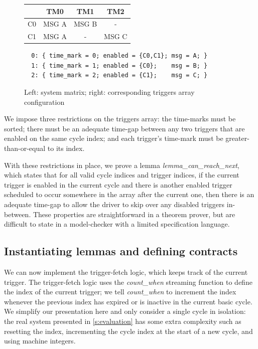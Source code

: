 \documentclass[a4paper,UKenglish,cleveref, autoref, thm-restate,anonymous]{lipics-v2021}
\begin{document}
\begin{figure}
  \begin{minipage}{0.38\textwidth}
\begin{tabular}{r|ccc}
   & TM0 & TM1 & TM2 \\
  \hline
  C0 & MSG A & MSG B & - \\
  C1 & MSG A & - & MSG C
\end{tabular}
\end{minipage}
\begin{minipage}{0.6\textwidth}
\small
\begin{verbatim}
  0: { time_mark = 0; enabled = {C0,C1}; msg = A; }
  1: { time_mark = 1; enabled = {C0};    msg = B; }
  2: { time_mark = 2; enabled = {C1};    msg = C; }
\end{verbatim}
\end{minipage}
  
\caption{Left: system matrix; right: corresponding triggers array configuration}
\label{f:tt-systemmatrix-ok}
\end{figure}



We impose three restrictions on the triggers array: the time-marks must be sorted; there must be an adequate time-gap between any two triggers that are enabled on the same cycle index; and each trigger's time-mark must be greater-than-or-equal to its index.

With these restrictions in place, we prove a lemma \emph{lemma_can_reach_next}, which states that for all valid cycle indices and trigger indices, if the current trigger is enabled in the current cycle and there is another enabled trigger scheduled to occur somewhere in the array after the current one, then there is an adequate time-gap to allow the driver to skip over any disabled triggers in-between.
These properties are straightforward in a theorem prover, but are difficult to state in a model-checker with a limited specification language.





\subsection{Instantiating lemmas and defining contracts}
\label{s:motivation:contract}

We can now implement the trigger-fetch logic, which keeps track of the current trigger.
The trigger-fetch logic uses the \emph{count_when} streaming function to define the index of the current trigger; we tell \emph{count_when} to increment the index whenever the previous index has expired or is inactive in the current basic cycle.
We simplify our presentation here and only consider a single cycle in isolation: the real system presented in \autoref{s:evaluation} has some extra complexity such as resetting the index, incrementing the cycle index at the start of a new cycle, and using machine integers.
\end{document}
